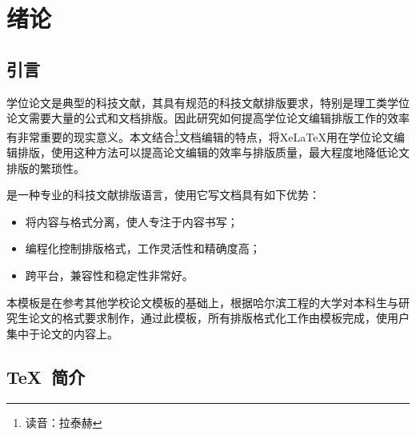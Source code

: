 
%
%
%


\chapter{绪论}
\label{chap01}

\section{引言}

学位论文是典型的科技文献，其具有规范的科技文献排版要求，特别是理工类学位论文需要大量的公式和文档排版。因此研究如何提高学位论文编辑排版工作的效率有非常重要的现实意义。本文结合\XeLaTeX{}\footnote{读音：拉泰赫}文档编辑的特点，将Xe\LaTeX{}用在学位论文编辑排版，使用这种方法可以提高论文编辑的效率与排版质量，最大程度地降低论文排版的繁琐性。

\XeLaTeX{}是一种专业的科技文献排版语言，使用它写文档具有如下优势：
\begin{itemize}
  \item 将内容与格式分离，使人专注于内容书写；
  \item 编程化控制排版格式，工作灵活性和精确度高；
  \item 跨平台，兼容性和稳定性非常好。
\end{itemize}

本模板是在参考其他学校论文模板的基础上，根据哈尔滨工程的大学对本科生与研究生论文的格式要求制作，通过此模板，所有排版格式化工作由模板完成，使用户集中于论文的内容上。

\section{TeX~简介}

